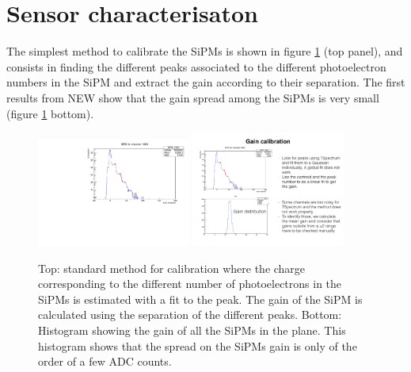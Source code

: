 \section{Sensor characterisaton}
The simplest method to calibrate the SiPMs is shown in figure \ref{fig:calibration} (top panel), and consists  in finding the different peaks associated to the different photoelectron numbers in the SiPM and extract the gain according to their separation. The first results from NEW show that the gain spread among the SiPMs is very small (figure \ref{fig:calibration} bottom).

\begin{figure}[h!]
\centering
\includegraphics[width=0.45\textwidth]{IMG/normal_calibration}
\includegraphics[width=0.45\textwidth]{IMG/SIPMsGain}
\caption{Top: standard method for calibration where the charge corresponding to the different number of photoelectrons in the SiPMs is estimated with a fit to the peak. The gain of the SiPM is calculated using the separation of the different peaks. Bottom: Histogram showing the gain of all the SiPMs in the plane. This histogram shows that the spread on the SiPMs gain is only of the order of a few ADC counts. 
}
\label{fig:calibration}
\end{figure}

